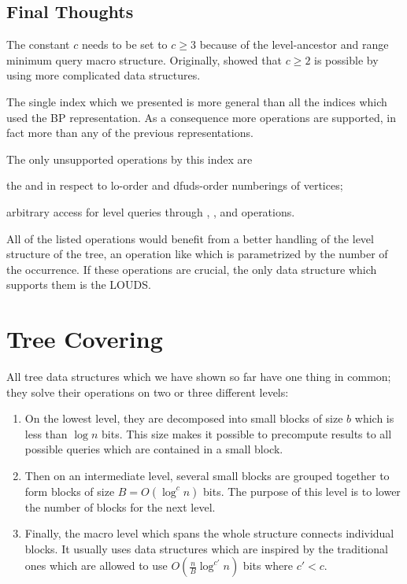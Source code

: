 \subsection{Final Thoughts}

The constant $c$ needs to be set to $c \ge 3$ because of the level-ancestor and range minimum query macro structure.
Originally, \cite{sadakane2010fully} showed that $c \ge 2$ is possible by using more complicated data structures.

\bigbreak

The single index which we presented is more general than all the indices which used the BP representation.
As a consequence more operations are supported, in fact more than any of the previous representations.

The only unsupported operations by this index are
\begin{enuminline}
	\item the \rank{} and \select{} in respect to lo-order and dfuds-order numberings of vertices;
	\item arbitrary access for level queries through \levelSize{}, \levelRank{}, and \levelSelect{} operations.
\end{enuminline}

All of the listed operations would benefit from a better handling of the level structure of the tree, an operation like \fwdSearch{} which is parametrized by the number of the occurrence.
If these operations are crucial, the only data structure which supports them is the LOUDS.

\section{Tree Covering}\label{s:TC}

All tree data structures which we have shown so far have one thing in common; they solve their operations on two or three different levels:
\begin{enumerate}
	\item On the lowest level, they are decomposed into small blocks of size $b$ which is less than $\log n$ bits.
	This size makes it possible to precompute results to all possible queries which are contained in a small block.
	
	\item Then on an intermediate level, several small blocks are grouped together to form blocks of size $B = O(\log^c n)$ bits.
	The purpose of this level is to lower the number of blocks for the next level.
	
	\item Finally, the macro level which spans the whole structure connects individual blocks.
	It usually uses data structures which are inspired by the traditional ones which are allowed to use $O(\frac{n}{B} \log^{c'} n)$ bits where $c' < c$.
\end{enumerate}

